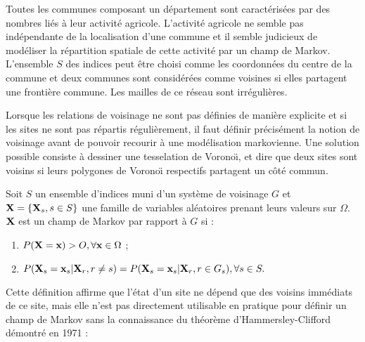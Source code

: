 \begin{ex}
Toutes les communes composant un d\'epartement sont caract\'eris\'ees
par des nombres li\'es \`a leur activit\'e agricole. L'activit\'e
agricole ne semble pas ind\'ependante de la localisation d'une commune et
il semble judicieux de mod\'eliser la r\'epartition spatiale de cette
activit\'e par un champ de Markov. L'ensemble $S$ des indices
peut \^etre choisi comme les coordonn\'ees  du centre de la
commune et deux communes sont consid\'er\'ees comme voisines si elles 
partagent une fronti\`ere commune. Les mailles de ce r\'eseau sont 
irr\'eguli\`eres.
\end{ex}
  

Lorsque les relations de voisinage ne sont pas d\'efinies de
mani\`ere explicite et si les sites ne sont pas r\'epartis
r\'eguli\`erement, il faut d\'efinir pr\'ecis\'ement la notion 
de voisinage avant de pouvoir recourir \`a une mod\'elisation
markovienne. Une solution possible consiste \`a dessiner une tesselation de
Vorono\"{\i}, et dire que deux sites sont voisins si leurs polygones 
de Vorono\"{\i} respectifs partagent un c\^ot\'e commun.


\begin{defi}
Soit $S$ un ensemble d'indices muni d'un syst\`eme de voisinage $G$ et
$\mbox{\bf X}=\{ \mbox{\bf X}_s,s \in S\}$ une famille de variables al\'eatoires prenant 
leurs valeurs sur  $\Omega$. $\mbox{\bf X}$ est un champ de Markov
par rapport \`a $G$ si :
\begin{enumerate}
\item $P(\mbox{\bf X}=\mbox{\bf x})>O, \forall \mbox{\bf x} \in \Omega$ ;
\item $P(\mbox{\bf X}_s=\mbox{\bf x}_s | \mbox{\bf X}_r, r\neq s)=P(\mbox{\bf X}_s=\mbox{\bf x}_s | \mbox{\bf X}_r, r \in G_s),\forall s\in S.$
\end{enumerate}
\end{defi}




Cette d\'efinition affirme que l'\'etat d'un site ne d\'epend que des
voisins imm\'ediats de ce site, mais elle n'est pas directement utilisable
en pratique pour d\'efinir un champ de Markov sans la connaissance du th\'eor\`eme
d'Hammersley-Clifford d\'emontr\'e en 1971 :

